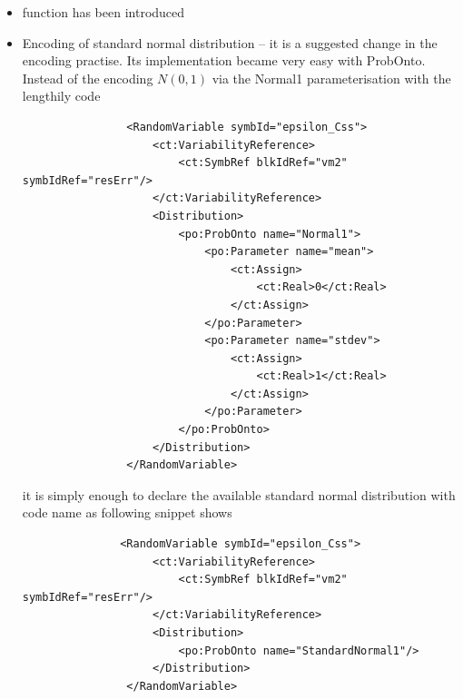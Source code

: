 \begin{itemize}
\item
{} function has been introduced
\item
Encoding of standard normal distribution -- it is a suggested change in the 
encoding practise. Its implementation became very easy with ProbOnto. Instead 
of the encoding $N(0,1)$ via the Normal1 parameterisation with the lengthily code
\lstset{language=XML}
\begin{lstlisting}
                <RandomVariable symbId="epsilon_Css">
                    <ct:VariabilityReference>
                        <ct:SymbRef blkIdRef="vm2" symbIdRef="resErr"/>
                    </ct:VariabilityReference>
                    <Distribution>
                        <po:ProbOnto name="Normal1">
                            <po:Parameter name="mean">
                                <ct:Assign>
                                    <ct:Real>0</ct:Real>
                                </ct:Assign>
                            </po:Parameter>
                            <po:Parameter name="stdev">
                                <ct:Assign>
                                    <ct:Real>1</ct:Real>
                                </ct:Assign>
                            </po:Parameter>
                        </po:ProbOnto>
                    </Distribution>
                </RandomVariable>
\end{lstlisting}
it is simply enough to declare the available standard normal distribution with code 
name  as following snippet shows
\lstset{language=XML}
\begin{lstlisting}
               <RandomVariable symbId="epsilon_Css">
                    <ct:VariabilityReference>
                        <ct:SymbRef blkIdRef="vm2" symbIdRef="resErr"/>
                    </ct:VariabilityReference>
                    <Distribution>
                        <po:ProbOnto name="StandardNormal1"/>
                    </Distribution>
                </RandomVariable>
\end{lstlisting}
\end{itemize}

